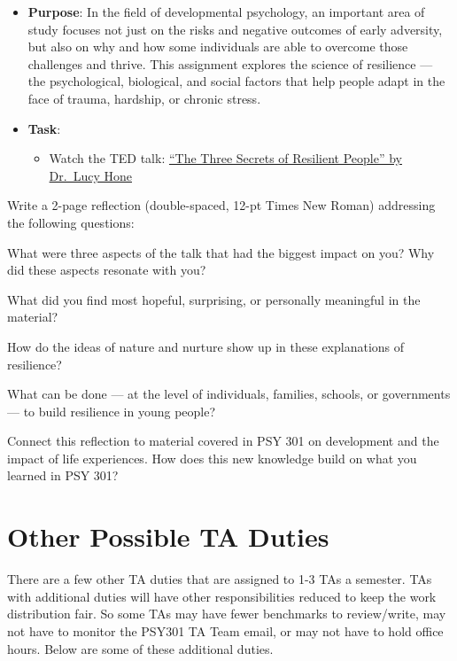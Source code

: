 \documentclass[
]{article}
\providecommand{\tightlist}{%
  \setlength{\itemsep}{0pt}\setlength{\parskip}{0pt}}
\begin{document}
\begin{itemize}
\item
  \textbf{Purpose}: In the field of developmental psychology, an important area of study focuses not just on the risks and negative outcomes of early adversity, but also on why and how some individuals are able to overcome those challenges and thrive. This assignment explores the science of resilience --- the psychological, biological, and social factors that help people adapt in the face of trauma, hardship, or chronic stress.
\item
  \textbf{Task}:

  \begin{itemize}
  \tightlist
  \item
    Watch the TED talk: \href{https://www.ted.com/talks/lucy_hone_the_three_secrets_of_resilient_people}{``The Three Secrets of Resilient People'' by Dr.~Lucy Hone}
  \end{itemize}
\end{itemize}

Write a 2-page reflection (double-spaced, 12-pt Times New Roman) addressing the following questions:

What were three aspects of the talk that had the biggest impact on you? Why did these aspects resonate with you?

What did you find most hopeful, surprising, or personally meaningful in the material?

How do the ideas of nature and nurture show up in these explanations of resilience?

What can be done --- at the level of individuals, families, schools, or governments --- to build resilience in young people?

Connect this reflection to material covered in PSY 301 on development and the impact of life experiences. How does this new knowledge build on what you learned in PSY 301?

\hypertarget{other-possible-ta-duties}{%
\section{Other Possible TA Duties}\label{other-possible-ta-duties}}

There are a few other TA duties that are assigned to 1-3 TAs a semester. TAs with additional duties will have other responsibilities reduced to keep the work distribution fair. So some TAs may have fewer benchmarks to review/write, may not have to monitor the PSY301 TA Team email, or may not have to hold office hours. Below are some of these additional duties.
\end{document}
